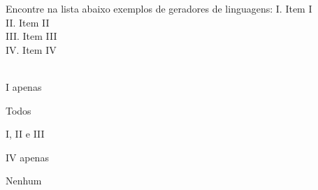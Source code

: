 \question[10]
Encontre na lista abaixo exemplos de geradores de linguagens:
I. Item I\\
II. Item II\\
III. Item III\\
IV. Item IV\\
\\
\begin{choices}
\item I apenas %
\item Todos
\item I, II e III
\item IV apenas
\item Nenhum
\end{choices}
\answerline

